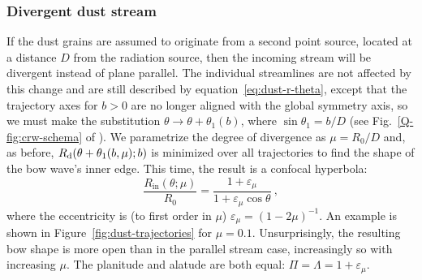 \subsubsection{Divergent dust stream}
\label{sec:dust-divergent}

If the dust grains are assumed to originate from a second point
source, located at a distance \(D\) from the radiation source, then
the incoming stream will be divergent instead of plane parallel.  The
individual streamlines are not affected by this change and are still
described by equation~\eqref{eq:dust-r-theta}, except that the
trajectory axes for \(b > 0\) are no longer aligned with the global
symmetry axis, so we must make the substitution
\(\theta \to \theta + \theta_1(b)\), where \(\sin \theta_1 = b / D\) (see
Fig.~\ref{Q-fig:crw-schema} of \PaperI{}). We parametrize the degree
of divergence as \(\mu = R_0 / D\) and, as before,
\(R_{\text{d}}(\theta + \theta_1(b, \mu); b)\) is minimized over all trajectories to
find the shape of the bow wave's inner edge.  This time, the result is
a confocal hyperbola:
\begin{equation}
  \label{eq:dust-divergent-r-in}
  \frac{R_{\text{in}}(\theta; \mu)} {R_0} = \frac{1 + \varepsilon_\mu}{1 + \varepsilon_\mu\cos\theta} \ ,
\end{equation}
where the eccentricity is (to first order in \(\mu\))
\( \varepsilon_\mu = (1 - 2\mu)^{-1}\).  An example is shown in
Figure~\ref{fig:dust-trajectories} for \(\mu = 0.1\).  Unsurprisingly,
the resulting bow shape is more open than in the parallel stream case,
increasingly so with increasing \(\mu\).  The planitude and alatude are
both equal: \(\Pi = \Lambda = 1 + \varepsilon_\mu\).



